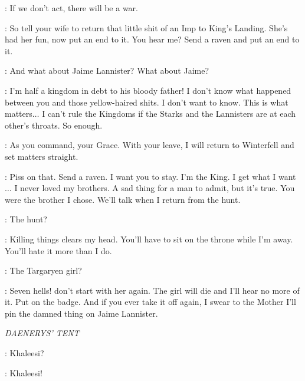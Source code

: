 \NED: If we don't act, there will be a war. 

\ROBERT: So tell your wife to return that little shit of an Imp to King's Landing. She's had her fun, now put an end to it. You hear me? Send a raven and put an end to it. 

\NED: And what about Jaime Lannister? What about Jaime? 

\ROBERT: I'm half a kingdom in debt to his bloody father! I don't know what happened between you and those yellow-haired shits. I don't want to know. This is what matters$\ldots$ I can't rule the Kingdoms if the Starks and the Lannisters are at each other's throats. So enough. 

\NED: As you command, your Grace. With your leave, I will return to Winterfell and set matters straight. 

\ROBERT: Piss on that. Send a raven. I want you to stay. I'm the King. I get what I want$\ldots$ I never loved my brothers. A sad thing for a man to admit, but it's true. You were the brother I chose. We'll talk when I return from the hunt. 

\NED: The hunt?

\ROBERT: Killing things clears my head. You'll have to sit on the throne while I'm away. You'll hate it more than I do. 

\NED: The Targaryen girl?

\ROBERT: Seven hells! don't start with her again. The girl will die and I'll hear no more of it. Put on the badge. And if you ever take it off again, I swear to the Mother I'll pin the damned thing on Jaime Lannister. 


\scene

\textit{DAENERYS' TENT} 


\IRRI: Khaleesi? 


\IRRI: Khaleesi! 


